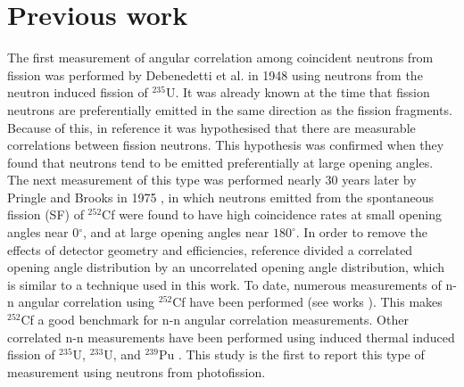 \section{Previous work}
The first measurement of angular correlation among coincident neutrons from fission was performed by Debenedetti et al. \cite{1948twoNCorr} in 1948 using neutrons from the neutron induced fission of $^{235}\text{U}$. It was already known at the time that fission neutrons are preferentially emitted in the same direction as the fission fragments. Because of this, in reference \cite{1948twoNCorr} it was hypothesised that there are measurable correlations between fission neutrons. This hypothesis was confirmed when they found that neutrons tend to be emitted preferentially at large opening angles. The next measurement of this type was performed nearly 30 years later by Pringle and Brooks in 1975 \cite{1975Cf252}, in which neutrons emitted from the spontaneous fission (SF) of $^{252}$Cf were found to have high coincidence rates at small opening angles near 0$^{\circ}$, and at large opening angles near $180^{\circ}$. In order to remove the effects of detector geometry and efficiencies, reference \cite{1975Cf252} divided a correlated opening angle distribution by an uncorrelated opening angle distribution, which is similar to a technique used in this work. To date, numerous measurements of n-n angular correlation using $^{252}$Cf have been performed (see works \cite{1975Cf252} \cite{2008CF252} \cite{Pozzi2014}). This makes $^{252}$Cf a good benchmark for n-n angular correlation measurements. Other correlated n-n measurements have been performed using induced thermal induced fission of $^{235}$U, $^{233}$U, and $^{239}$Pu \cite{Sokolov2010}. This study is the first to report this type of measurement using neutrons from photofission.



